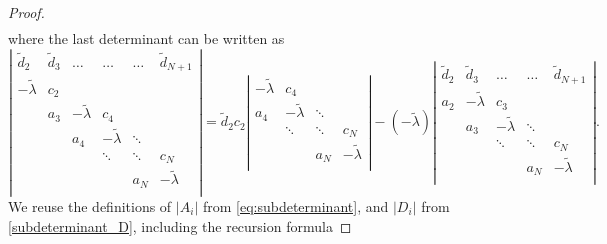 \documentclass[a4paper, 11pt]{article}
\begin{document}
\begin{proof}
\begin{eqnarray*}
    \end{eqnarray*}
    where the last determinant can be written as
    \begin{equation*}
        \left|
        \begin{array}{cccccc}
         \widetilde{d}_{2} & \widetilde{d}_{3} & \hdots & \dots & \dots & \widetilde{d}_{{N+1}} \\
          -\widetilde{\lambda} & c_2 & & & &   \\
         & a_3 & -\widetilde{\lambda} & c_4 & &\\
         &   & a_4 & -\widetilde{\lambda} & \ddots   \\
         &   &  & \ddots & \ddots & c_N   \\
         &   & & & a_N & -\widetilde{\lambda}   \\
        \end{array}
        \right| = \widetilde{d}_{2} c_2 \left|
        \begin{array}{cccc}
           -\widetilde{\lambda} & c_4  &  &   \\
          a_4 & -\widetilde{\lambda} & \ddots  &   \\
        & \ddots & \ddots & c_N \\
         &  & a_N & -\widetilde{\lambda}   \\
        \end{array}
        \right| - (-\widetilde{\lambda})  \left|
        \begin{array}{cccccc}
          \widetilde{d}_{2} & \widetilde{d}_{3} & \dots & \dots & \widetilde{d}_{{N+1}} \\
          a_2 &  -\widetilde{\lambda} & c_3  &  & \\
        & a_3 & -\widetilde{\lambda} & \ddots & \\
        & & \ddots & \ddots & c_N \\
         & &   & a_N & -\widetilde{\lambda}   \\
        \end{array}
        \right|.
    \end{equation*}
    We reuse the definitions of $|A_i|$ from \eqref{eq:subdeterminant}, and $|D_i|$ from \eqref{subdeterminant_D}, including the recursion formula

\end{proof}
\end{document}
